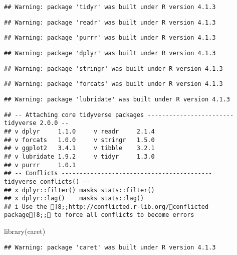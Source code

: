 \documentclass[
]{article}
\newenvironment{Shaded}{\begin{snugshade}}{\end{snugshade}}
\newcommand{\FunctionTok}[1]{\textcolor[rgb]{0.00,0.00,0.00}{#1}}
\newcommand{\NormalTok}[1]{#1}
\begin{document}
\begin{verbatim}
## Warning: package 'tidyr' was built under R version 4.1.3
\end{verbatim}

\begin{verbatim}
## Warning: package 'readr' was built under R version 4.1.3
\end{verbatim}

\begin{verbatim}
## Warning: package 'purrr' was built under R version 4.1.3
\end{verbatim}

\begin{verbatim}
## Warning: package 'dplyr' was built under R version 4.1.3
\end{verbatim}

\begin{verbatim}
## Warning: package 'stringr' was built under R version 4.1.3
\end{verbatim}

\begin{verbatim}
## Warning: package 'forcats' was built under R version 4.1.3
\end{verbatim}

\begin{verbatim}
## Warning: package 'lubridate' was built under R version 4.1.3
\end{verbatim}

\begin{verbatim}
## -- Attaching core tidyverse packages ------------------------ tidyverse 2.0.0 --
## v dplyr     1.1.0     v readr     2.1.4
## v forcats   1.0.0     v stringr   1.5.0
## v ggplot2   3.4.1     v tibble    3.2.1
## v lubridate 1.9.2     v tidyr     1.3.0
## v purrr     1.0.1     
## -- Conflicts ------------------------------------------ tidyverse_conflicts() --
## x dplyr::filter() masks stats::filter()
## x dplyr::lag()    masks stats::lag()
## i Use the ]8;;http://conflicted.r-lib.org/conflicted package]8;; to force all conflicts to become errors
\end{verbatim}

\begin{Shaded}
\begin{Highlighting}[]
\FunctionTok{library}\NormalTok{(caret)}
\end{Highlighting}
\end{Shaded}

\begin{verbatim}
## Warning: package 'caret' was built under R version 4.1.3
\end{verbatim}
\end{document}
